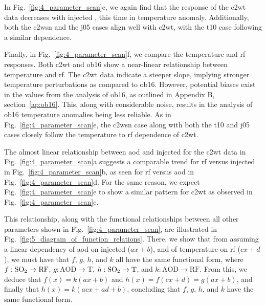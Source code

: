 \documentclass{ametsocV6.1}
\newcommand{\iso}[1][i]{{#1}njected \ce{SO2}}
\begin{document}
In Fig.~\ref{fig:4_parameter_scan}e, we again find that the response of the \gls{c2wt}
data decreases with \iso{}, this time in temperature anomaly. Additionally, both the
\gls{c2wsn} and the \gls{j05} cases align well with \gls{c2wt}, with the \gls{t10} case
following a similar dependence.

Finally, in Fig.~\ref{fig:4_parameter_scan}f, we compare the temperature and \gls{rf}
responses. Both \gls{c2wt} and \gls{ob16} show a near-linear relationship between
temperature and \gls{rf}. The \gls{c2wt} data indicate a steeper slope, implying
stronger temperature perturbations as compared to \gls{ob16}. However, potential biases
exist in the values from the analysis of \gls{ob16}, as outlined in Appendix B,
section~\ref{ap:ob16}. This, along with considerable noise, results in the analysis of
\gls{ob16} temperature anomalies being less reliable. As in
Fig.~\ref{fig:4_parameter_scan}e, the \gls{c2wsn} case along with both the \gls{t10} and
\gls{j05} cases closely follow the temperature to \gls{rf} dependence of \gls{c2wt}.

The almost linear relationship between \gls{aod} and \iso{} for the \gls{c2wt} data in
Fig.~\ref{fig:4_parameter_scan}a suggests a comparable trend for \gls{rf} versus \iso{}
in Fig.~\ref{fig:4_parameter_scan}b, as seen for \gls{rf} versus \gls{aod} in
Fig.~\ref{fig:4_parameter_scan}d. For the same reason, we expect
Fig.~\ref{fig:4_parameter_scan}e to show a similar pattern for \gls{c2wt} as observed in
Fig.~\ref{fig:4_parameter_scan}c.

This relationship, along with the functional relationships between all other parameters
shown in Fig.~\ref{fig:4_parameter_scan}, are illustrated in
Fig.~\ref{fig:5_diagram_of_function_relations}. There, we show that from assuming a
linear dependency of \gls{aod} on \iso{} (\(ax+b\)), and of temperature on \gls{rf}
(\(cx+d\)), we must have that \(f\), \(g\), \(h\), and \(k\) all have the same
functional form, where \(f: \ce{SO2} \to \mathrm{RF}\), \(g: \mathrm{AOD} \to
\mathrm{T}\), \(h: \ce{SO2} \to \mathrm{T}\), and \(k: \mathrm{AOD} \to \mathrm{RF}\).
From this, we deduce that \(f(x)=k(ax+b)\) and \(h(x)=f(cx+d)=g(ax+b)\), and finally
that \(h(x)=k(acx+ad+b)\), concluding that \(f\), \(g\), \(h\), and \(k\) have the same
functional form.
\end{document}
